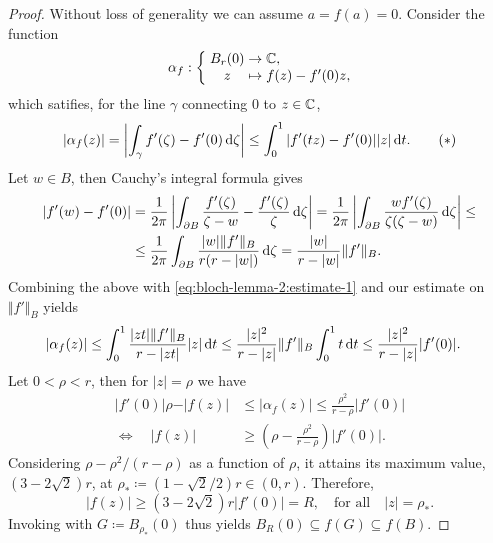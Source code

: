 \begin{proof}
    Without loss of generality we can assume $a = f(a) = 0$. Consider the function
    $$ \mapping{\alpha_f}{B_{r}(0) & \to & \C,}{z & \mapsto & f(z) - f'(0) z,} $$
    which satifies, for the line $\gamma$ connecting $0$ to $z \in \mathbb{C}$,
    \begin{equation} \label{eq:bloch-lemma-2:estimate-1}
        \vert \alpha_f(z) \vert = \left\vert \int_\gamma f'(\zeta) - f'(0) \mathop{}\!\mathrm{d} \zeta \right\vert \leq \int_0^1 \vert f'(t z) - f'(0) \vert \vert z \vert \mathop{}\!\mathrm{d} t. \tag{\textasteriskcentered}
    \end{equation}
    Let $w \in B$, then Cauchy's integral formula gives
    \begin{align*}
        \vert f'(w) - f'(0) \vert &= \frac{1}{2\pi} \left\vert \int_{\partial B} \frac{f'(\zeta)}{\zeta - w} - \frac{f'(\zeta)}{\zeta} \mathop{}\!\mathrm{d} \zeta \right\vert = \frac{1}{2\pi} \left\vert \int_{\partial B} \frac{w f'(\zeta)}{\zeta (\zeta - w)} \mathop{}\!\mathrm{d} \zeta \right\vert \leq \\
        &\leq \frac{1}{2\pi} \int_{\partial B} \frac{\vert w \vert \Vert f' \Vert_B}{r(r - \vert w \vert)} \mathop{}\!\mathrm{d} \zeta = \frac{\vert w \vert}{r - \vert w \vert} \Vert f' \Vert_B.
    \end{align*}
    Combining the above with \eqref{eq:bloch-lemma-2:estimate-1} and our estimate on $\Vert f' \Vert_B$ yields
    \begin{align*}
        \vert \alpha_f(z) \vert &\leq \int_0^1 \frac{\vert z t \vert \Vert f' \Vert_B}{r - \vert z t \vert} \vert z \vert \mathop{}\!\mathrm{d} t \leq \frac{\vert z \vert^2}{r - \vert z \vert} \Vert f' \Vert_B \int_0^1 t \mathop{}\!\mathrm{d} t \leq \frac{\vert z \vert^2}{r - \vert z \vert} \vert f'(0) \vert.
    \end{align*}
    Let $0 < \rho < r$, then for $\vert z \vert = \rho$ we have
    \begin{align*}
        \vert f'(0) \vert \rho - \vert f(z) \vert &\leq \vert \alpha_f(z) \vert \leq \frac{\rho^2}{r - \rho} \vert f'(0) \vert \\
        \Longleftrightarrow \quad \vert f(z) \vert &\geq \left( \rho - \frac{\rho^2}{r - \rho} \right) \vert f'(0) \vert.
    \end{align*}
    Considering $\rho - \rho^2 / (r - \rho)$ as a function of $\rho$, it attains its maximum value, $(3 - 2 \sqrt{2}) r$, at $\rho_* \coloneqq (1 - \sqrt{2} / 2)r \in (0, r)$. Therefore,
    \begin{equation*}
        \vert f(z) \vert \geq (3 - 2 \sqrt{2}) r \vert f'(0) \vert = R, \quad \textrm{for all} \quad \vert z \vert = \rho_*.
    \end{equation*}
    Invoking  with $G \coloneqq B_{\rho_*}(0)$ thus yields $B_{R}(0) \subseteq f(G) \subseteq f(B)$.
\end{proof}

